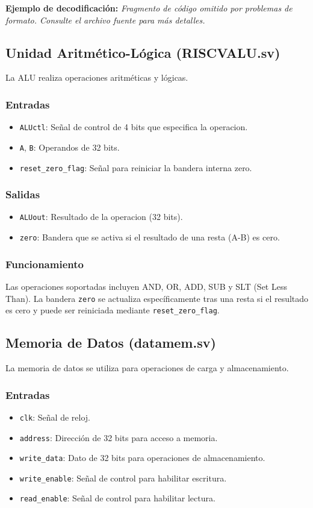 \documentclass[conference]{IEEEtran}
\begin{document}
\textbf{Ejemplo de decodificación:}
\textit{Fragmento de código omitido por problemas de formato. Consulte el archivo fuente para más detalles.}

\subsection{Unidad Aritmético-Lógica (RISCVALU.sv)}
La ALU realiza operaciones aritméticas y lógicas.
\subsubsection{Entradas}
\begin{itemize}
    \item \texttt{ALUctl}: Señal de control de 4 bits que especifica la operacion.
    \item \texttt{A}, \texttt{B}: Operandos de 32 bits.
    \item \texttt{reset\_zero\_flag}: Señal para reiniciar la bandera interna zero.
\end{itemize}
\subsubsection{Salidas}
\begin{itemize}
    \item \texttt{ALUout}: Resultado de la operacion (32 bits).
    \item \texttt{zero}: Bandera que se activa si el resultado de una resta (A-B) es cero.
\end{itemize}
\subsubsection{Funcionamiento}
Las operaciones soportadas incluyen AND, OR, ADD, SUB y SLT (Set Less Than). La bandera \texttt{zero} se actualiza específicamente tras una resta si el resultado es cero y puede ser reiniciada mediante \texttt{reset\_zero\_flag}.

\subsection{Memoria de Datos (datamem.sv)}
La memoria de datos se utiliza para operaciones de carga y almacenamiento.
\subsubsection{Entradas}
\begin{itemize}
    \item \texttt{clk}: Señal de reloj.
    \item \texttt{address}: Dirección de 32 bits para acceso a memoria.
    \item \texttt{write\_data}: Dato de 32 bits para operaciones de almacenamiento.
    \item \texttt{write\_enable}: Señal de control para habilitar escritura.
    \item \texttt{read\_enable}: Señal de control para habilitar lectura.
\end{itemize}
\end{document}
